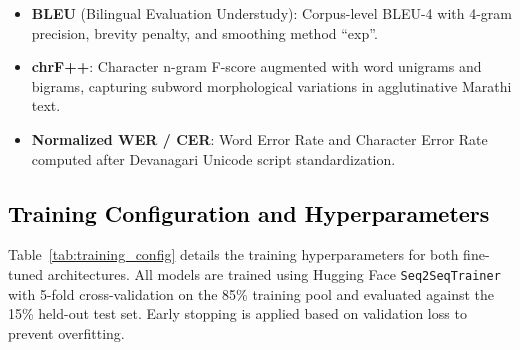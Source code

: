 \begin{itemize}
    \item \textbf{BLEU} (Bilingual Evaluation Understudy): Corpus-level BLEU-4 with 4-gram precision, brevity penalty, and smoothing method ``exp''.
    \item \textbf{chrF++}: Character n-gram F-score augmented with word unigrams and bigrams, capturing subword morphological variations in agglutinative Marathi text.
    \item \textbf{Normalized WER / CER}: Word Error Rate and Character Error Rate computed after Devanagari Unicode script standardization.
\end{itemize}

\subsection{\textcolor{black}{Training Configuration and Hyperparameters}}

Table~\ref{tab:training_config} details the training hyperparameters for both fine-tuned architectures. All models are trained using Hugging Face \texttt{Seq2SeqTrainer} with 5-fold cross-validation on the 85\% training pool and evaluated against the 15\% held-out test set. Early stopping is applied based on validation loss to prevent overfitting.

